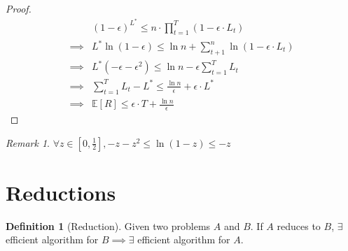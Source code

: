 \documentclass[11pt]{article}
\theoremstyle{definition}
\newtheorem{definition}{Definition}[section]
\theoremstyle{remark}
\newtheorem*{remark}{Remark}
\begin{document}
\begin{proof}
\begin{align*}
& (1-\epsilon)^{L^*} \leq n \cdot \prod_{t=1}^{T} (1 - \epsilon \cdot L_t) \\ 
\implies & L^* \ln (1-\epsilon) \leq \ln n + \sum _{t+1}^n \ln (1 - \epsilon \cdot L_t) \\
\implies & L^* (-\epsilon-\epsilon^2) \leq \ln n - \epsilon \sum_{t=1}^T L_t \\
\implies & \sum_{t=1}^T L_t - L^* \leq \frac{\ln n}{\epsilon} + \epsilon \cdot L^* \\
\implies & \mathbb{E}[R] \leq \epsilon \cdot T + \frac{\ln n}{\epsilon}
\end{align*}
\end{proof}

\begin{remark} $\forall z \in [0,\frac{1}{2}], -z-z^2 \leq \ln (1-z) \leq -z$
\end{remark}

\section{Reductions}
\begin{definition}[Reduction]
Given two problems $A$ and $B$. If $A$ reduces to $B$, $\exists$ efficient algorithm for $B \implies \exists$ efficient algorithm for $A$. 
\end{definition}
\end{document}
